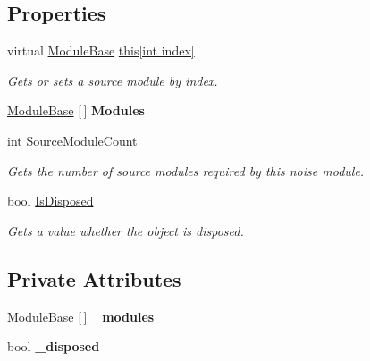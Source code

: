 \subsection*{Properties}
\begin{DoxyCompactItemize}
\item 
virtual \hyperlink{class_lib_noise_1_1_module_base}{Module\+Base} \hyperlink{class_lib_noise_1_1_module_base_a82ba7cc8a454de882e305ebb0e9e2e1c}{this\mbox{[}int index\mbox{]}}
\begin{DoxyCompactList}\small\item\em Gets or sets a source module by index. \end{DoxyCompactList}\item 
\mbox{\label{class_lib_noise_1_1_module_base_a2037b14c6b82fc7033224b2a31faf8d4}} 
\hyperlink{class_lib_noise_1_1_module_base}{Module\+Base} \mbox{[}$\,$\mbox{]} {\bfseries Modules}
\item 
int \hyperlink{class_lib_noise_1_1_module_base_a3f901b6cb96ad011f20f1ce922ff67fc}{Source\+Module\+Count}
\begin{DoxyCompactList}\small\item\em Gets the number of source modules required by this noise module. \end{DoxyCompactList}\item 
bool \hyperlink{class_lib_noise_1_1_module_base_adcf3d5aa2957501de0577a6a8317c2d5}{Is\+Disposed}
\begin{DoxyCompactList}\small\item\em Gets a value whether the object is disposed. \end{DoxyCompactList}\end{DoxyCompactItemize}
\subsection*{Private Attributes}
\begin{DoxyCompactItemize}
\item 
\mbox{\label{class_lib_noise_1_1_module_base_a9585e85a1f53257d15c8e937a5a1ab2d}} 
\hyperlink{class_lib_noise_1_1_module_base}{Module\+Base} \mbox{[}$\,$\mbox{]} {\bfseries \+\_\+modules}
\item 
\mbox{\label{class_lib_noise_1_1_module_base_a0fb9bd75bb79ab2ef4f7f465b9b2603b}} 
bool {\bfseries \+\_\+disposed}
\end{DoxyCompactItemize}


